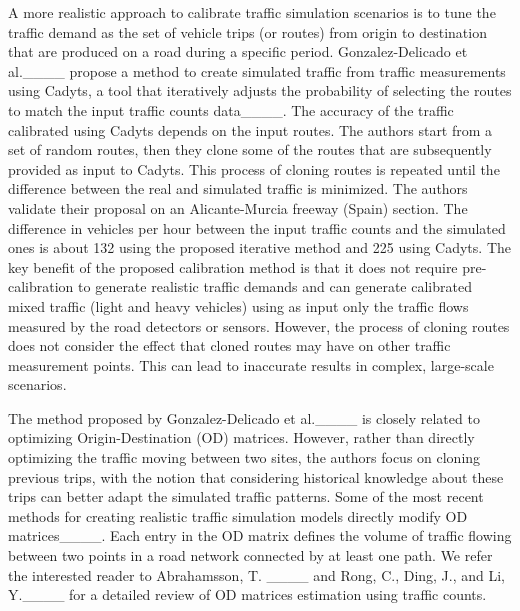 A more realistic approach to calibrate traffic simulation scenarios is to tune the traffic demand as the set of vehicle trips (or routes) from origin to destination that are produced on a road during a specific period. Gonzalez-Delicado et al.____ propose a method to create simulated traffic from traffic measurements using Cadyts, a tool that iteratively adjusts the probability of selecting the routes to match the input traffic counts data____. The accuracy of the traffic calibrated using Cadyts depends on the input routes. The authors start from a set of random routes, then they clone some of the routes that are subsequently provided as input to Cadyts. This process of cloning routes is repeated until the difference between the real and simulated traffic is minimized. The authors validate their proposal on an Alicante-Murcia freeway (Spain) section. The difference in vehicles per hour between the input traffic counts and the simulated ones is about 132 using the proposed iterative method and 225 using Cadyts. The key benefit of the proposed calibration method is that it does not require pre-calibration to generate realistic traffic demands and can generate calibrated mixed traffic (light and heavy vehicles) using as input only the traffic flows measured by the road detectors or sensors. However, the process of cloning routes does not consider the effect that cloned routes may have on other traffic measurement points. This can lead to inaccurate results in complex, large-scale scenarios.

The method proposed by Gonzalez-Delicado et al.____ is closely related to optimizing Origin-Destination (OD) matrices. However, rather than directly optimizing the traffic moving between two sites, the authors focus on cloning previous trips, with the notion that considering historical knowledge about these trips can better adapt the simulated traffic patterns. Some of the most recent methods for creating realistic traffic simulation models directly modify OD matrices____. Each entry in the OD matrix defines the volume of traffic flowing between two points in a road network connected by at least one path. We refer the interested reader to Abrahamsson, T. ____ and Rong, C., Ding, J., and Li, Y.____ for a detailed review of OD matrices estimation using traffic counts.

